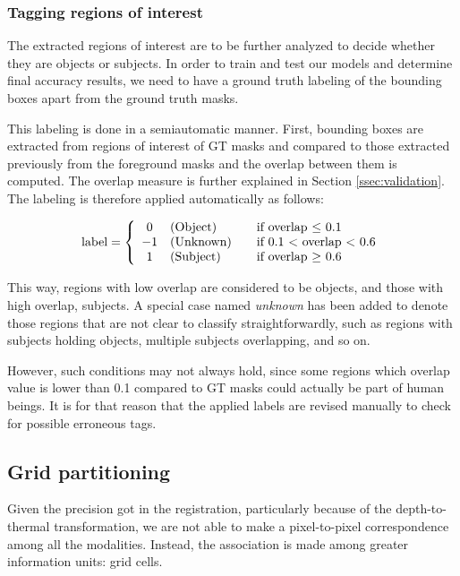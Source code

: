 \documentclass[10pt,twocolumn,letterpaper]{article}
\begin{document}
\subsubsection{Tagging regions of interest}
\label{sssec:tagging}
The extracted regions of interest are to be further analyzed to decide whether they are objects or subjects. In order to train and test our models and determine final accuracy results, we need to have a ground truth labeling of the bounding boxes apart from the ground truth masks. 

This labeling is done in a semiautomatic manner. First, bounding boxes are extracted from regions of interest of GT masks and compared to those extracted previously from the foreground masks and the overlap between them is computed. The overlap measure is further explained in Section \ref{ssec:validation}. The labeling is therefore applied automatically as follows: 

\begin{gather}
\text{label} = \left\{ 
  \begin{array}{c l l}
    0  & \text{(Object)} & \quad \text{if overlap $\leq$ 0.1 }\\
    -1 & \text{(Unknown)} & \quad \text{if 0.1 $<$ overlap $<$ 0.6}\\
    1 & \text{(Subject)} & \quad \text{if overlap $\geq$ 0.6 }
  \end{array} \right.
 \end{gather}

This way, regions with low overlap are considered to be objects, and those with high overlap, subjects. A special case named \emph{unknown} has been added to denote those regions that are not clear to classify straightforwardly, such as regions with subjects holding objects, multiple subjects overlapping, and so on. 

However, such conditions may not always hold, since some regions which overlap value is lower than 0.1 compared to GT masks could actually be part of human beings. It is for that reason that the applied labels are revised manually to check for possible erroneous tags.

\subsection{Grid partitioning}
\label{ssec:gridpartitioning}

Given the precision got in the registration, particularly because of the depth-to-thermal transformation, we are not able to make a pixel-to-pixel correspondence among all the modalities. Instead, the association is made among greater information units: grid cells. 
\end{document}
